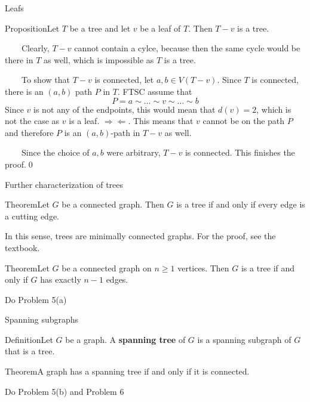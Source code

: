 \documentclass{beamer}
\def\bl[#1]#2{\begin{block}{#1}#2\end{block}}
\begin{document}
\begin{frame}{Leafs}
\bl[Proposition]{Let $T$ be a tree and let $v$ be a leaf of $T$. Then $T-v$ is a tree.}
~~~~Clearly, $T-v$ cannot contain a cylce, because then the same cycle would be there in $T$ as well, which is impossible as $T$ is a tree.

~~~~To show that $T-v$ is connected, let $a,b\in V(T-v)$. Since $T$ is connected, there is an $(a,b)$ path $P$ in $T$. FTSC assume that
\[
P=a\sim\dots\sim v\sim\dots\sim b
\]
Since $v$ is not any of the endpoints, this would mean that $d(v)=2$, which is not the case as $v$ is a leaf. $\Rightarrow\Leftarrow$.  This means that $v$ cannot be on the path $P$ and therefore $P$ is an $(a,b)$-path in $T-v$ as well.

~~~~Since the choice of $a,b$ were arbitrary, $T-v$ is connected. This finishes the proof.\qed
\end{frame}

\begin{frame}{Further characterization of trees}
\bl[Theorem]{Let $G$ be a connected graph. Then $G$ is a tree if and only if every edge is a cutting edge.}
In this sense, trees are minimally connected graphs. For the proof, see the textbook.
\bl[Theorem]{Let $G$ be a connected graph on $n\geq 1$ vertices. Then $G$ is a tree if and only if $G$ has exactly $n-1$ edges.}

\begin{center}
Do Problem 5(a)
\end{center}
\end{frame}

\begin{frame}[t]{Spanning subgraphs}
\bl[Definition]{Let $G$ be a graph. A \textbf{spanning tree} of $G$ is a spanning subgraph of $G$ that is a tree.}
\bl[Theorem]{A graph has a spanning tree if and only if it is connected.}

\end{frame}
\begin{frame}
\begin{center}
Do Problem 5(b) and Problem 6
\end{center}
\end{frame}
\end{document}
